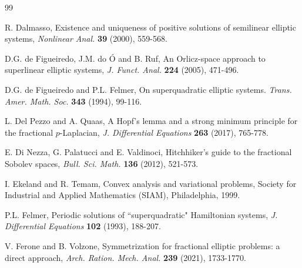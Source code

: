 \documentclass[10pt]{article}
\numberwithin{equation}{section}
\numberwithin{equation}{section}
\begin{document}
\begin{thebibliography}{99}

 R. Dalmasso, Existence and uniqueness of positive solutions of semilinear elliptic systems, {\it Nonlinear Anal.} {\bf 39} (2000), 559-568.

 D.G. de Figueiredo, J.M. do \'{O} and B. Ruf, An {O}rlicz-space approach to superlinear elliptic systems, {\it J. Funct. Anal.} {\bf 224} (2005), 471-496.

 D.G. de Figueiredo and P.L. Felmer, On superquadratic elliptic systems. {\it Trans. Amer. Math. Soc.} {\bf 343} (1994), 99-116.

 L. Del Pezzo and A. Quaas, A Hopf's lemma and a strong minimum principle for the fractional $p$-Laplacian, {\it J. Differential Equations} {\bf 263} (2017), 765-778.


 E. Di Nezza, G. Palatucci and E. Valdinoci, Hitchhiker's guide to the fractional Sobolev spaces, {\it Bull. Sci. Math.} {\bf 136} (2012), 521-573.

 I. Ekeland and R. Temam, Convex analysis and variational problems, Society for Industrial and Applied Mathematics (SIAM), Philadelphia, 1999.



 P.L. Felmer, Periodic solutions of ``superquadratic" Hamiltonian systems, {\it J. Differential Equations} {\bf 102} (1993), 188-207.

 V. Ferone and B. Volzone,
Symmetrization for fractional elliptic problems: a direct approach,
{\it Arch. Ration. Mech. Anal.} {\bf 239} (2021), 1733-1770.


\end{thebibliography}
\end{document}
